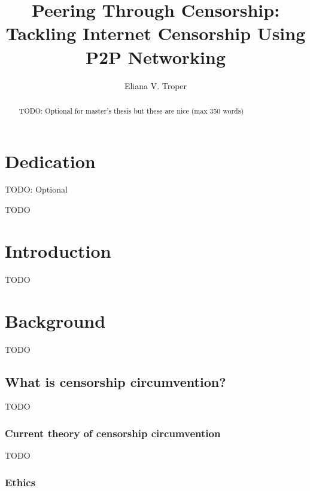 \documentclass[12pt]{report}
\title{Peering Through Censorship:\\Tackling Internet Censorship Using P2P Networking}
\author{Eliana V. Troper}
\begin{document}

\maketitle    %

\begin{abstract}
TODO: Optional for master's thesis but these are nice (max 350 words)
\end{abstract}


\chapter*{Dedication}

TODO: Optional


TODO

\tableofcontents

\listoffigures  %
\listoftables   %

\newpage


\chapter{Introduction}

TODO

\chapter{Background}

TODO

\section{What is censorship circumvention?}

TODO

\subsection{Current theory of censorship circumvention}

TODO

\subsection{Ethics}
\end{document}
